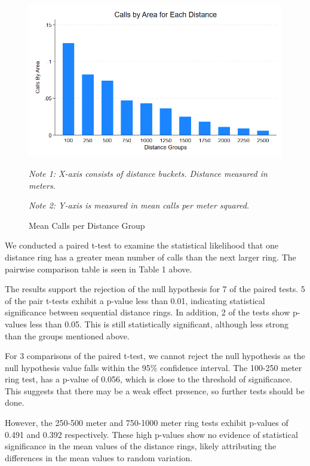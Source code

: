 \documentclass[12pt]{article}
\begin{document}
\begin{figure}[!h]
    \centering
    \includegraphics[width=1\linewidth]{Reproducibility Package//Visual Graphics/Avg_Calls_per_Distance_Group.png}
    \caption{Mean Calls per Distance Group}
    \label{fig: Average Number of Calls per Distance Group}
      \textit{Note 1: X-axis consists of distance buckets. Distance measured in meters.}

      \textit{Note 2: Y-axis is measured in mean calls per meter squared.}
\end{figure}

We conducted a paired t-test to examine the statistical likelihood that one distance ring has a greater mean number of calls than the next larger ring. The pairwise comparison table is seen in Table 1 above.

The results support the rejection of the null hypothesis for 7 of the paired tests. 5 of the pair t-tests exhibit a p-value less than 0.01, indicating statistical significance between sequential distance rings. In addition, 2 of the tests show p-values less than 0.05. This is still statistically significant, although less strong than the groups mentioned above. 

For 3 comparisons of the paired t-test, we cannot reject the null hypothesis as the null hypothesis value falls within the 95\% confidence interval. The 100-250 meter ring test, has a p-value of 0.056, which is close to the threshold of significance. This suggests that there may be a weak effect presence, so further tests should be done.

However, the 250-500 meter and 750-1000 meter ring tests exhibit p-values of 0.491 and 0.392 respectively. These high p-values show no evidence of statistical significance in the mean values of the distance rings, likely attributing the differences in the mean values to random variation.
\end{document}
